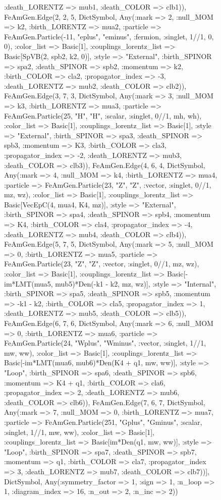\documentclass{revtex4}
\begin{document}
\begin{figure}[!htb]
\begin{center}
{:death_LORENTZ => mub1, :death_COLOR => clb1)), FeAmGen.Edge(2, 2, 5, Dict{Symbol, Any}(:mark => 2, :null_MOM => k2, :birth_LORENTZ => mua2, :particle => FeAmGen.Particle(-11, "eplus", "eminus", :fermion, :singlet, 1//1, 0, 0), :color_list => Basic[1], :couplings_lorentz_list => Basic[SpVB(2, spb2, k2, 0)], :style => "External", :birth_SPINOR => spa2, :death_SPINOR => spb2, :momentum => k2, :birth_COLOR => cla2, :propagator_index => -3, :death_LORENTZ => mub2, :death_COLOR => clb2)), FeAmGen.Edge(3, 7, 3, Dict{Symbol, Any}(:mark => 3, :null_MOM => k3, :birth_LORENTZ => mua3, :particle => FeAmGen.Particle(25, "H", "H", :scalar, :singlet, 0//1, mh, wh), :color_list => Basic[1], :couplings_lorentz_list => Basic[1], :style => "External", :birth_SPINOR => spa3, :death_SPINOR => spb3, :momentum => K3, :birth_COLOR => cla3, :propagator_index => -2, :death_LORENTZ => mub3, :death_COLOR => clb3)), FeAmGen.Edge(4, 6, 4, Dict{Symbol, Any}(:mark => 4, :null_MOM => k4, :birth_LORENTZ => mua4, :particle => FeAmGen.Particle(23, "Z", "Z", :vector, :singlet, 0//1, mz, wz), :color_list => Basic[1], :couplings_lorentz_list => Basic[VecEpC(4, mua4, K4, mz)], :style => "External", :birth_SPINOR => spa4, :death_SPINOR => spb4, :momentum => K4, :birth_COLOR => cla4, :propagator_index => -4, :death_LORENTZ => mub4, :death_COLOR => clb4)), FeAmGen.Edge(5, 7, 5, Dict{Symbol, Any}(:mark => 5, :null_MOM => 0, :birth_LORENTZ => mua5, :particle => FeAmGen.Particle(23, "Z", "Z", :vector, :singlet, 0//1, mz, wz), :color_list => Basic[1], :couplings_lorentz_list => Basic[-im*LMT(mua5, mub5)*Den(-k1 - k2, mz, wz)], :style => "Internal", :birth_SPINOR => spa5, :death_SPINOR => spb5, :momentum => -k1 - k2, :birth_COLOR => cla5, :propagator_index => 1, :death_LORENTZ => mub5, :death_COLOR => clb5)), FeAmGen.Edge(6, 7, 6, Dict{Symbol, Any}(:mark => 6, :null_MOM => 0, :birth_LORENTZ => mua6, :particle => FeAmGen.Particle(24, "Wplus", "Wminus", :vector, :singlet, 1//1, mw, ww), :color_list => Basic[1], :couplings_lorentz_list => Basic[-im*LMT(mua6, mub6)*Den(K4 + q1, mw, ww)], :style => "Loop", :birth_SPINOR => spa6, :death_SPINOR => spb6, :momentum => K4 + q1, :birth_COLOR => cla6, :propagator_index => 2, :death_LORENTZ => mub6, :death_COLOR => clb6)), FeAmGen.Edge(7, 6, 7, Dict{Symbol, Any}(:mark => 7, :null_MOM => 0, :birth_LORENTZ => mua7, :particle => FeAmGen.Particle(251, "Gplus", "Gminus", :scalar, :singlet, 1//1, mw, ww), :color_list => Basic[1], :couplings_lorentz_list => Basic[im*Den(q1, mw, ww)], :style => "Loop", :birth_SPINOR => spa7, :death_SPINOR => spb7, :momentum => q1, :birth_COLOR => cla7, :propagator_index => 3, :death_LORENTZ => mub7, :death_COLOR => clb7))], Dict{Symbol, Any}(:symmetry_factor => 1, :sign => 1, :n_loop => 1, :diagram_index => 16, :n_out => 2, :n_inc => 2)) 
}
\end{center}
\end{figure}
\end{document}
